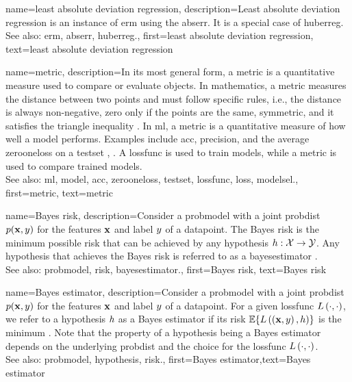 {name={least absolute deviation regression},
 description={Least absolute deviation regression 
 	is an instance of \gls{erm} using the \gls{abserr}. It is a special case of \gls{huberreg}.
				\\
 See also: \gls{erm}, \gls{abserr}, \gls{huberreg}.},
 first={least absolute deviation regression},
 text={least absolute deviation regression}
}

{name={metric},
	description={In its most general form, a metric is a quantitative measure used to 
		compare or evaluate objects. In mathematics, a metric measures the distance between two points 
		and must follow specific rules, i.e., the distance is always non-negative, zero only if the points are 
		the same, symmetric, and it satisfies the triangle inequality \cite{RudinBookPrinciplesMatheAnalysis}. 
		In \gls{ml}, a metric is a quantitative measure of how well a \gls{model} performs. Examples include \gls{acc}, 
		precision, and the average \gls{zerooneloss} on a \gls{testset} \cite{Goodfellow-et-al-2016}, \cite{BishopBook}. 
		A \gls{lossfunc} is used to train \glspl{model}, while a metric is used to compare trained \glspl{model}.
		\\ See also: \gls{ml}, \gls{model}, \gls{acc}, \gls{zerooneloss}, \gls{testset}, \gls{lossfunc}, \gls{loss}, \gls{modelsel}.},
	first={metric}, 
  text={metric}
 }

{name={Bayes risk},
 description={Consider a \gls{probmodel} with a joint \gls{probdist} $p({\bf x},y)$ for 
 	the \glspl{feature} ${\bf x}$ and \gls{label} $y$ of a \gls{datapoint}. The 
 	Bayes \gls{risk} is the \gls{minimum} possible \gls{risk} that can be achieved by any \gls{hypothesis} 
$h: \mathcal{X} \rightarrow \mathcal{Y}$. Any \gls{hypothesis} that achieves 
the Bayes \gls{risk} is referred to as a \gls{bayesestimator} \cite{LC}.
		\\
		See also: \gls{probmodel}, \gls{risk}, \gls{bayesestimator}.},
	first={Bayes risk},
	text={Bayes risk}
}
	
{name={Bayes estimator},
  description={Consider a \gls{probmodel} with a joint \gls{probdist} 
  	$p({\bf x},y)$ for the \glspl{feature} ${\bf x}$ and \gls{label} $y$ 
  	of a \gls{datapoint}. For a given \gls{lossfunc} $L\left(\cdot,\cdot \right)$, we refer to a \gls{hypothesis} 
    $h$ as a Bayes estimator if its \gls{risk} $\mathbb{E}\{L\left(\left( {\bf x},y \right),h \right)\}$ is the 
\gls{minimum} \cite{LC}. Note that the property of a \gls{hypothesis} being a Bayes estimator depends on 
the underlying \gls{probdist} and the choice for the \gls{lossfunc} $L\left(\cdot,\cdot \right)$.
		\\
		See also: \gls{probmodel},  \gls{hypothesis}, \gls{risk}.},
		first={Bayes estimator},text={Bayes estimator}}


